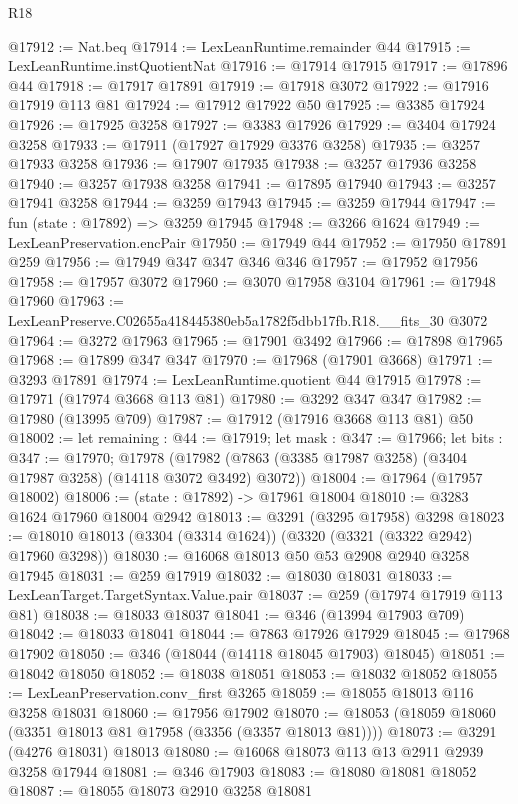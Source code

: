 \begin{lexlean}{R18}
\begin{coremodule}
@17912 := Nat.beq
@17914 := LexLeanRuntime.remainder @44
@17915 := LexLeanRuntime.instQuotientNat
@17916 := @17914 @17915
@17917 := @17896 @44
@17918 := @17917 @17891
@17919 := @17918 @3072
@17922 := @17916 @17919 @113 @81
@17924 := @17912 @17922 @50
@17925 := @3385 @17924
@17926 := @17925 @3258
@17927 := @3383 @17926
@17929 := @3404 @17924 @3258
@17933 := @17911 (@17927 @17929 @3376 @3258)
@17935 := @3257 @17933 @3258
@17936 := @17907 @17935
@17938 := @3257 @17936 @3258
@17940 := @3257 @17938 @3258
@17941 := @17895 @17940
@17943 := @3257 @17941 @3258
@17944 := @3259 @17943
@17945 := @3259 @17944
@17947 := fun (state : @17892) => @3259 @17945
@17948 := @3266 @1624
@17949 := LexLeanPreservation.encPair
@17950 := @17949 @44
@17952 := @17950 @17891 @259
@17956 := @17949 @347 @347 @346 @346
@17957 := @17952 @17956
@17958 := @17957 @3072
@17960 := @3070 @17958 @3104
@17961 := @17948 @17960
@17963 := LexLeanPreserve.C02655a418445380eb5a1782f5dbb17fb.R18.__fits_30 @3072
@17964 := @3272 @17963
@17965 := @17901 @3492
@17966 := @17898 @17965
@17968 := @17899 @347 @347
@17970 := @17968 (@17901 @3668)
@17971 := @3293 @17891
@17974 := LexLeanRuntime.quotient @44 @17915
@17978 := @17971 (@17974 @3668 @113 @81)
@17980 := @3292 @347 @347
@17982 := @17980 (@13995 @709)
@17987 := @17912 (@17916 @3668 @113 @81) @50
@18002 := let remaining : @44 := @17919;
  let mask : @347 := @17966;
  let bits : @347 := @17970;
  @17978 (@17982 (@7863 (@3385 @17987 @3258) (@3404 @17987 @3258) (@14118 @3072 @3492) @3072))
@18004 := @17964 (@17957 @18002)
@18006 := (state : @17892) -> @17961 @18004
@18010 := @3283 @1624 @17960 @18004 @2942
@18013 := @3291 (@3295 @17958) @3298
@18023 := @18010 @18013 (@3304 (@3314 @1624)) (@3320 (@3321 (@3322 @2942) @17960 @3298))
@18030 := @16068 @18013 @50 @53 @2908 @2940 @3258 @17945
@18031 := @259 @17919
@18032 := @18030 @18031
@18033 := LexLeanTarget.TargetSyntax.Value.pair
@18037 := @259 (@17974 @17919 @113 @81)
@18038 := @18033 @18037
@18041 := @346 (@13994 @17903 @709)
@18042 := @18033 @18041
@18044 := @7863 @17926 @17929
@18045 := @17968 @17902
@18050 := @346 (@18044 (@14118 @18045 @17903) @18045)
@18051 := @18042 @18050
@18052 := @18038 @18051
@18053 := @18032 @18052
@18055 := LexLeanPreservation.conv_first @3265
@18059 := @18055 @18013 @116 @3258 @18031
@18060 := @17956 @17902
@18070 := @18053 (@18059 @18060 (@3351 @18013 @81 @17958 (@3356 (@3357 @18013 @81))))
@18073 := @3291 (@4276 @18031) @18013
@18080 := @16068 @18073 @113 @13 @2911 @2939 @3258 @17944
@18081 := @346 @17903
@18083 := @18080 @18081 @18052
@18087 := @18055 @18073 @2910 @3258 @18081

\end{coremodule}
\end{lexlean}

